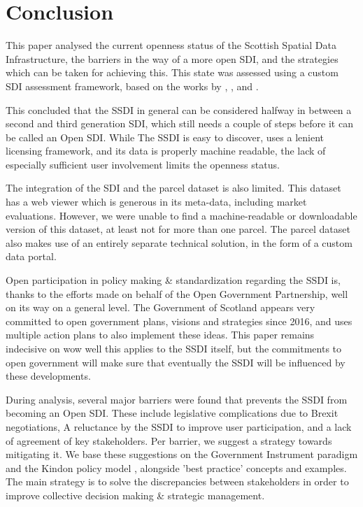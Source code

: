 \section{Conclusion}

This paper analysed the current openness status of the Scottish Spatial Data Infrastructure, 
the barriers in the way of a more open SDI, and the strategies which can be taken for achieving this. This state was assessed using a custom SDI assessment framework, based on the works by \citet{assessing_openness_SDI_2018}, \citet{mulder}, and \citet{olausson}. 

This concluded that the SSDI in general can be considered halfway in between a second and third generation SDI, which still needs a couple of steps before it can be called an Open SDI. While The SSDI is easy to discover, uses a lenient licensing framework, and its data is properly machine readable, the lack of especially sufficient user involvement limits the openness status. 

The integration of the SDI and the parcel dataset is also limited. This dataset has a web viewer which is generous in its meta-data, including market evaluations. However, we were unable to find a machine-readable or downloadable version of this dataset, at least not for more than one parcel. The parcel dataset also makes use of an entirely separate technical solution, in the form of a custom data portal. 

Open participation in policy making \& standardization regarding the SSDI is, thanks to the efforts made on behalf of the Open Government Partnership, well on its way on a general level. The Government of Scotland appears very committed to open government plans, visions and strategies since 2016, and uses multiple action plans to also implement these ideas. This paper remains indecisive on wow well this applies to the SSDI itself, but the commitments to open government will make sure that eventually the SSDI will be influenced by these developments. 

During analysis, several major barriers were found that prevents the SSDI from becoming an Open SDI. These include legislative complications due to Brexit negotiations, A reluctance by the SSDI to improve user participation, and a lack of agreement of key stakeholders. Per barrier, we suggest a strategy towards mitigating it. We base these suggestions on the Government Instrument paradigm \citep{gov_instruments}and the Kindon policy model \citep{kingdon}, alongside 'best practice' concepts and examples. The main strategy is to solve the discrepancies between stakeholders in order to improve collective decision making \& strategic management. 

